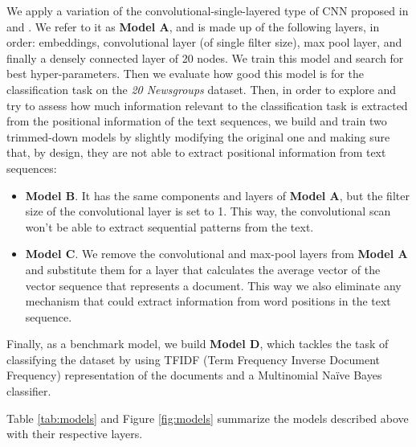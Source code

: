 \documentclass[10pt,journal,compsoc, onecolumn]{IEEEtran}
\begin{document}
We apply a variation of the convolutional-single-layered type of CNN proposed in \cite{Kim} and \cite{Zhang}. We refer to it as \textbf{Model A}, and is made up of the following layers, in order: embeddings, convolutional layer (of single filter size), max pool layer, and finally a densely connected layer of 20 nodes. We train this model and search for best hyper-parameters. Then we evaluate how good this model is for the classification task on the \emph{20 Newsgroups} dataset. Then, in order to explore and try to assess how much information relevant to the classification task is extracted from the positional information of the text sequences, we build and train two trimmed-down models by slightly modifying the original one and making sure that, by design, they are not able to extract positional information from text sequences:
\begin{itemize}
    \item \textbf{Model B}. It has the same components and layers of \textbf{Model A}, but the filter size of the convolutional layer is set to 1. This way, the convolutional scan won't be able to extract sequential patterns from the text.
    \item \textbf{Model C}. We remove the convolutional and max-pool layers from \textbf{Model A} and substitute them for a layer that calculates the average vector of the vector sequence that represents a document. This way we also eliminate any mechanism that could extract information from word positions in the text sequence.
\end{itemize}

Finally, as a benchmark model, we build \textbf{Model D}, which tackles the task of classifying the dataset by using TFIDF (Term Frequency Inverse Document Frequency) representation of the documents and a Multinomial Naïve Bayes classifier.

Table \ref{tab:models} and Figure \ref{fig:models} summarize the models described above with their respective layers.

\begin{table}[h]
\caption{Model configurations}
\label{tab:models}
\begin{center}
\end{center}
\end{table}
\end{document}
